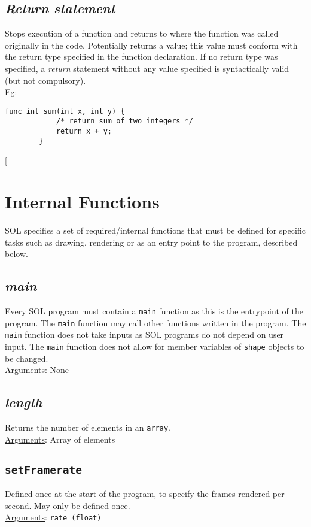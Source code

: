 \documentclass[letterpaper,12pt]{article}
\begin{document}
\subsection{\textit{Return statement}}
Stops execution of a function and returns to where the function was called originally in the code. Potentially returns a value; this value must conform with the return type specified in the function declaration. If no return type was specified, a \textit{return} statement without any value specified is syntactically valid (but not compulsory).\\
Eg: \begin{lstlisting}[aboveskip=-13pt]
        func int sum(int x, int y) {
            /* return sum of two integers */
            return x + y;
        }
    \end{lstlisting}[
    
    \section{Internal Functions} \label{internal}
    SOL specifies a set of required/internal functions that must be defined for specific tasks such as drawing, rendering or as an entry point to the program, described below.
    
    \subsection{\textit{main}}
    Every SOL program must contain a \texttt{main} function as this is the entrypoint of the program. The \texttt{main} function may call other functions written in the program. The \texttt{main} function does not take inputs as SOL programs do not depend on user input. The \texttt{main} function does not allow for member variables of \texttt{shape} objects to be changed.\\
    \underline{Arguments}: None
    
    \subsection{\textit{length}}
    Returns the number of elements in an \texttt{array}.\\
    \underline{Arguments}: Array of elements
    
    \subsection{\texttt{setFramerate}}
    Defined once at the start of the program, to specify the frames rendered per second. May only be defined once.\\
    \underline{Arguments}: \texttt{rate (float)}
    
\end{document}
